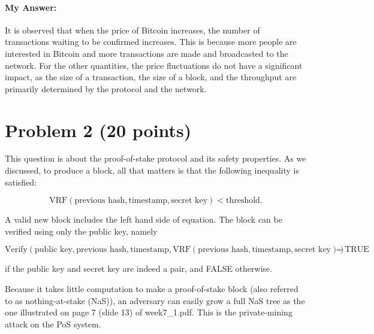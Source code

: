 \documentclass{article}
\begin{document}
\begin{enumerate}[label=(\alph*)]
        \paragraph*{My Answer:} It is observed that when the price of Bitcoin increases, the number of transactions waiting to be confirmed increases. This is because more people are interested in Bitcoin and more transactions are made and broadcasted to the network. For the other quantities, the price fluctuations do not have a significant impact, as the size of a transaction, the size of a block, and the throughput are primarily determined by the protocol and the network.
\end{enumerate}

\section{Problem 2 (20 points)}

This question is about the proof-of-stake protocol and its safety properties.  As we discussed, to produce a block, all that matters is that the following inequality is satisfied:

\begin{equation}
    \text{VRF}( \text{previous hash}, \text{timestamp}, \text{secret key} ) < \text{threshold}.
\end{equation}

A valid new block includes the left hand side of equation.  The block can be verified using only the public key, namely

\begin{equation}
    \text{Verify}( \text{public key}, \text{previous hash}, \text{timestamp}, \text{VRF}( \text{previous hash}, \text{timestamp}, \text{secret key} ) ) = \text{TRUE}
\end{equation}

if the public key and secret key are indeed a pair, and FALSE otherwise.

Because it takes little computation to make a proof-of-stake block (also referred to as nothing-at-stake (NaS)), an adversary can easily grow a full NaS tree as the one illustrated on page 7 (slide 13) of week7\_1.pdf. This is the private-mining attack on the PoS system.
\end{document}

